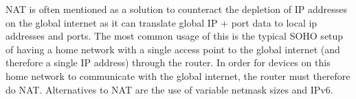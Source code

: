 NAT is often mentioned as a solution to counteract the depletion of IP addresses on the global internet as it can translate global IP + port data to local ip addresses and ports. The most common usage of this is the typical SOHO setup of having a home network with a single access point to the global internet (and therefore a single IP address) through the router. In order for devices on this home network to communicate with the global internet, the router must therefore do NAT. Alternatives to NAT are the use of variable netmask sizes and IPv6.
